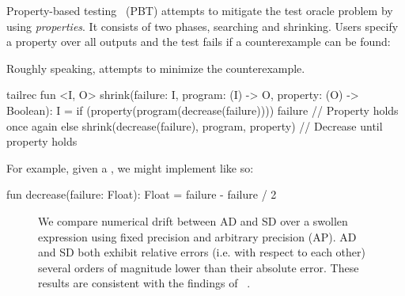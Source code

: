 Property-based testing~\citep{fink1997property} (PBT) attempts to mitigate the test oracle problem by using \textit{properties}. It consists of two phases, searching and shrinking. Users specify a property over all outputs and the test fails if a counterexample can be found:
%
%
Roughly speaking,  attempts to minimize the counterexample.
%
\begin{kotlinlisting}
tailrec fun <I, O> shrink(failure: I, program: (I) -> O, property: (O) -> Boolean): I =
    if (property(program(decrease(failure)))) failure // Property holds once again
    else shrink(decrease(failure), program, property) // Decrease until property holds
\end{kotlinlisting}
%
For example, given a , we might implement  like so:
%
\begin{kotlinlisting}
fun decrease(failure: Float): Float = failure - failure / 2
\end{kotlinlisting}
%
\begin{figure}
\caption{We compare numerical drift between AD and SD over a swollen expression using fixed precision and arbitrary precision (AP). AD and SD both exhibit relative errors (i.e. with respect to each other) several orders of magnitude lower than their absolute error. These results are consistent with the findings of ~\citet{laue2019equivalence}.\vspace{-10pt}}
\label{fig:pbt_comparison}
\end{figure}
